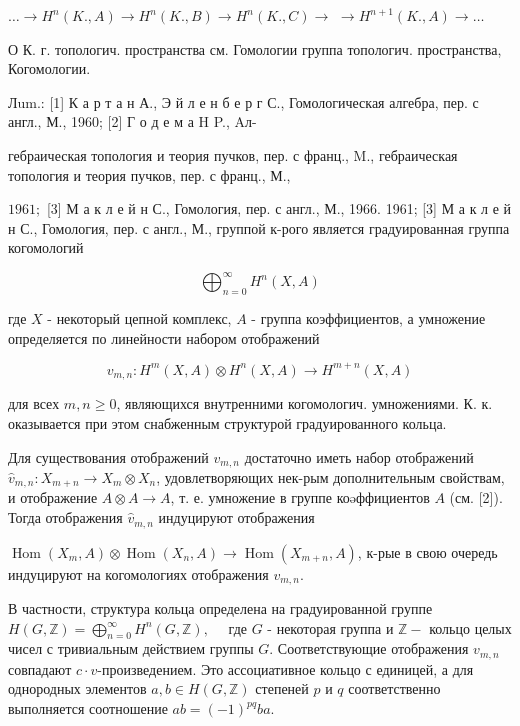 \documentclass[10pt]{article}
\begin{document}
$\ldots \longrightarrow H^{n}(K ., A) \longrightarrow H^{n}(K ., B) \rightarrow H^{n}(K ., C) \longrightarrow$ $\longrightarrow H^{n+1}(K ., A) \longrightarrow \ldots$



О К. г. топологич. пространства см. Гомологии группа топологич. пространства, Когомологии.



Лum.: [1] К а р т а н А., Э й л е н б е р г С., Гомологическая алгебра, пер. с англ., М., 1960; [2] Г о д е м а H P., Aл-

гебраическая топология и теория пучков, пер. с франц., M., гебраическая топология и теория пучков, пер. с франц., М.,

$1961 ;$ [3] М а к л е й н С., Гомология, пер. с англ., М., 1966. 1961; [3] М а к л е й н С., Гомология, пер. с англ., М., группой к-рого является градуированная группа когомологий



\[

\bigoplus_{n=0}^{\infty} H^{n}(X, A)

\]



где $X$ - некоторый цепной комплекс, $A$ - группа коэффициентов, а умножение определяется по линейности набором отображений



\[

v_{m, n}: H^{m}(X, A) \otimes H^{n}(X, A) \longrightarrow H^{m+n}(X, A)

\]



для всех $m, n \geqslant 0$, являющихся внутренними когомологич. умножениями. К. к. оказывается при этом снабженным структурой градуированного кольца.



Для существования отображений $v_{m, n}$ достаточно иметь набор отображений $\hat{v}_{m, n}: X_{m+n} \rightarrow X_{m} \otimes X_{n}$, удовлетворяющих нек-рым дополнительным свойствам, и отображение $A \otimes A \rightarrow A$, т. е. умножение в группе коəффициентов $A$ (см. [2]). Тогда отображения $\hat{v}_{m, n}$ индуцируют отображения



$\operatorname{Hom}\left(X_{m}, A\right) \otimes \operatorname{Hom}\left(X_{n}, A\right) \rightarrow \operatorname{Hom}\left(X_{m+n}, A\right)$, к-рые в свою очередь индуцируют на когомологиях отображения $v_{m, n}$.



В частности, структура кольца определена на градуированной группе $H(G, \mathbb{Z})=\bigoplus_{n=0}^{\infty} H^{n}(G, \mathbb{Z}), \quad$ где $G$ - некоторая группа и $\mathbb{Z}-$ кольцо целых чисел с тривиальным действием группы $G$. Соответствующие отображения $v_{m, n}$ совпадают $c \cdot v$-произведением. Это ассоциативное кольцо с единицей, а для однородных элементов $a, b \in H(G, \mathbb{Z})$ степеней $p$ и $q$ соответственно выполняется соотношение $a b=(-1)^{p q} b a$.
\end{document}
